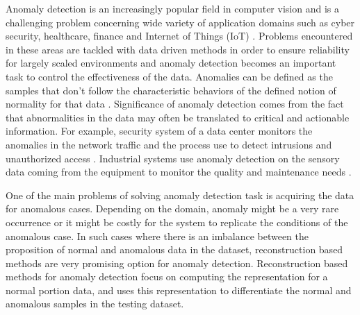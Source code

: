 
\begingroup

Anomaly detection is an increasingly popular field in computer vision and is a challenging 
problem concerning wide variety of application domains such as cyber security, healthcare, 
finance and Internet of Things (IoT) \cite{Chandola:2009:ADS:1541880.1541882}. Problems encountered
in these areas are tackled with data driven methods in order to ensure reliability for largely scaled 
environments and anomaly detection becomes an important task to control the effectiveness of the data.
Anomalies can be defined as the samples that don't follow the characteristic behaviors 
of the defined notion of normality for that data \cite{Chandola07anomalydetection:}. 
Significance of anomaly detection comes 
from the fact that abnormalities in the data may often be translated to critical and 
actionable information. For example, security system of a data center monitors the anomalies 
in the network traffic and the process use to detect intrusions and unauthorized access \cite{JABEZ2015338,AHMED201619}.
Industrial systems use anomaly detection on the sensory data coming from the equipment to 
monitor the quality and maintenance needs \cite{inproceedings_industry}. 

One of the main problems of solving anomaly detection task is acquiring the data for anomalous cases. 
Depending on the domain, anomaly might be a very rare occurrence or it might be costly for the 
system to replicate the conditions of the anomalous case. 
In such cases where there is an imbalance between the proposition of normal and anomalous 
data in the dataset, reconstruction based methods are very promising option for anomaly detection. 
Reconstruction based methods for anomaly detection focus on computing the representation for 
a normal portion data, and uses this representation to differentiate the normal and anomalous 
samples in the testing dataset. 

